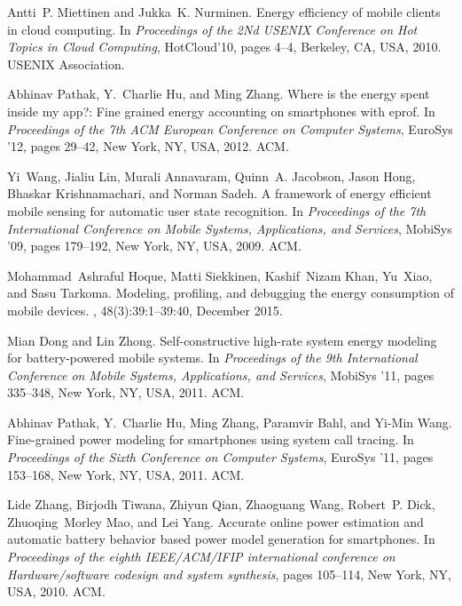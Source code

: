 \documentclass[journal]{IEEEtran}
\begin{document}
\begin{thebibliography}{10}
Antti~P. Miettinen and Jukka~K. Nurminen.
\newblock Energy efficiency of mobile clients in cloud computing.
\newblock In {\em Proceedings of the 2Nd USENIX Conference on Hot Topics in
  Cloud Computing}, HotCloud'10, pages 4--4, Berkeley, CA, USA, 2010. USENIX
  Association.

Abhinav Pathak, Y.~Charlie Hu, and Ming Zhang.
\newblock Where is the energy spent inside my app?: Fine grained energy
  accounting on smartphones with eprof.
\newblock In {\em Proceedings of the 7th ACM European Conference on Computer
  Systems}, EuroSys '12, pages 29--42, New York, NY, USA, 2012. ACM.

Yi~Wang, Jialiu Lin, Murali Annavaram, Quinn~A. Jacobson, Jason Hong, Bhaskar
  Krishnamachari, and Norman Sadeh.
\newblock A framework of energy efficient mobile sensing for automatic user
  state recognition.
\newblock In {\em Proceedings of the 7th International Conference on Mobile
  Systems, Applications, and Services}, MobiSys '09, pages 179--192, New York,
  NY, USA, 2009. ACM.

Mohammad~Ashraful Hoque, Matti Siekkinen, Kashif~Nizam Khan, Yu~Xiao, and Sasu
  Tarkoma.
\newblock Modeling, profiling, and debugging the energy consumption of mobile
  devices.
, 48(3):39:1--39:40, December 2015.

Mian Dong and Lin Zhong.
\newblock Self-constructive high-rate system energy modeling for
  battery-powered mobile systems.
\newblock In {\em Proceedings of the 9th International Conference on Mobile
  Systems, Applications, and Services}, MobiSys '11, pages 335--348, New York,
  NY, USA, 2011. ACM.

Abhinav Pathak, Y.~Charlie Hu, Ming Zhang, Paramvir Bahl, and Yi-Min Wang.
\newblock Fine-grained power modeling for smartphones using system call
  tracing.
\newblock In {\em Proceedings of the Sixth Conference on Computer Systems},
  EuroSys '11, pages 153--168, New York, NY, USA, 2011. ACM.

Lide Zhang, Birjodh Tiwana, Zhiyun Qian, Zhaoguang Wang, Robert~P. Dick,
  Zhuoqing~Morley Mao, and Lei Yang.
\newblock Accurate online power estimation and automatic battery behavior based
  power model generation for smartphones.
\newblock In {\em Proceedings of the eighth IEEE/ACM/IFIP international
  conference on Hardware/software codesign and system synthesis}, pages
  105--114, New York, NY, USA, 2010. ACM.


\end{thebibliography}
\end{document}
